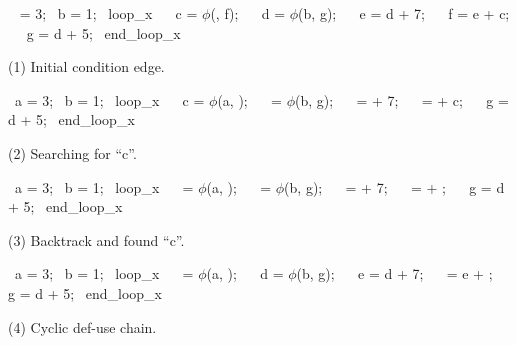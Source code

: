 \documentclass{article}
\newcommand{\PHI}{\ensuremath{\phi}}
\begin{document}
\begin{center}
\begin{minipage}{3cm}
  \begin{fprog}
~ = 3;
~b = 1;
~loop\_x
~~ c = \PHI(, f);
~~ d = \PHI(b, g);
~~ e = d + 7;
~~ f = e + c;
~~ g = d + 5;
~end\_loop\_x
  \end{fprog}

    \smallskip
    \tiny
    (1) Initial condition edge.
  \end{minipage}
  \begin{minipage}{3cm}
    \begin{fprog}
~a = 3;
~b = 1;
~loop\_x
~~ c = \PHI(a, );
~~  = \PHI(b, g);
~~  =  + 7;
~~  =  + c;
~~ g = d + 5;
~end\_loop\_x
    \end{fprog}

    \smallskip
    \tiny
    (2) Searching for ``c''.
  \end{minipage}
  \begin{minipage}{3cm}
    \begin{fprog}
~a = 3;
~b = 1;
~loop\_x
~~  = \PHI(a, );
~~  = \PHI(b, g);
~~  =  + 7;
~~  =  + ;
~~ g = d + 5;
~end\_loop\_x
    \end{fprog}

    \smallskip
    \tiny
    (3) Backtrack and found ``c''.
  \end{minipage}
  \begin{minipage}{3cm}
    \begin{fprog}
~a = 3;
~b = 1;
~loop\_x
~~  = \PHI(a, );
~~ d = \PHI(b, g);
~~ e = d + 7;
~~  = e + ;
~~ g = d + 5;
~end\_loop\_x
    \end{fprog}

    \smallskip
    \tiny
    (4) Cyclic def-use chain.
  \end{minipage}
\end{center}
\end{document}
